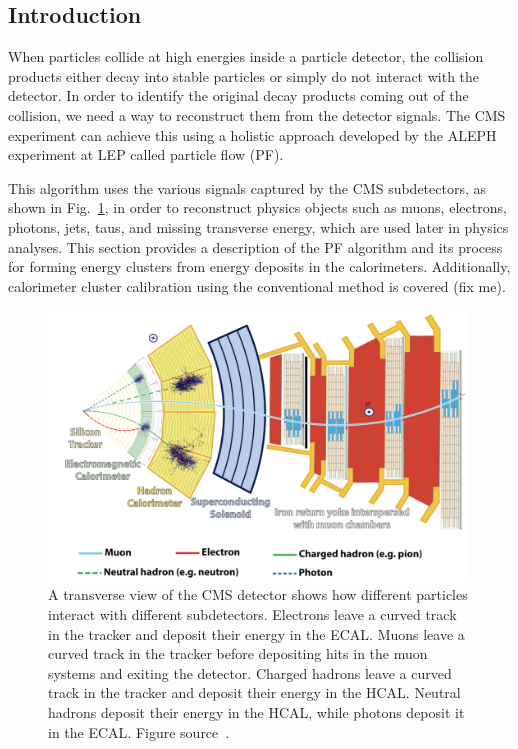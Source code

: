 \subsection{Introduction}
When particles collide at high energies inside a particle detector, the collision products either decay into stable particles or simply do not interact with the detector.
In order to identify the original decay products coming out of the collision, we need a way to reconstruct them from the detector signals.
The CMS experiment can achieve this using a holistic approach developed by the ALEPH experiment at LEP called particle flow (PF).

This algorithm uses the various signals captured by the CMS subdetectors, as shown in Fig.~\ref{fig:Particles_in_CMS}, %
in order to reconstruct physics objects such as muons, electrons, photons, jets, taus, and missing transverse energy, which are used later in physics analyses.
This section provides a description of the PF algorithm and its process for forming energy clusters from energy deposits in the calorimeters.
Additionally, calorimeter cluster calibration using the conventional method is covered (fix me).

\begin{figure}[t!]
\centering
\includegraphics[width=0.99\textwidth]{figures/particles_signture_in_detector.png}
\caption[Transverse view of the CMS detector]{A transverse view of the CMS detector shows how different particles interact with different subdetectors. Electrons leave a curved track in the tracker and deposit their energy in the ECAL. Muons leave a curved track in the tracker before depositing hits in the muon systems and exiting the detector. Charged hadrons leave a curved track in the tracker and deposit their energy in the HCAL. Neutral hadrons deposit their energy in the HCAL, while photons deposit it in the ECAL. Figure source~\cite{PF}.}
\label{fig:Particles_in_CMS}
\end{figure}


